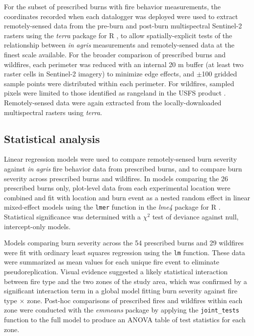 \documentclass[fire,article,submit,oneauthor,pdftex]{Definitions/mdpi}
\begin{document}
For the subset of prescribed burns with fire behavior measurements, the coordinates recorded when each datalogger was deployed were used to extract remotely-sensed data from the pre-burn and post-burn multispectral Sentinel-2 rasters using the \emph{terra} package for \textsf{R} \cite{hijmans2022}, to allow spatially-explicit tests of the relationship between \emph{in agris} measurements and remotely-sensed data at the finest scale available. 
For the broader comparison of prescribed burns and wildfires, each perimeter was reduced with an internal 20 m buffer (at least two raster cells in Sentinel-2 imagery) to minimize edge effects, and $\pm$100 gridded sample points were distributed within each perimeter. 
For wildfires, sampled pixels were limited to those identified as rangeland in the USFS product \cite{usdaforestservicenodate}. 
Remotely-sensed data were again extracted from the locally-downloaded multispectral rasters using \emph{terra}.

\subsection{Statistical analysis} 

Linear regression models were used to compare remotely-sensed burn severity against \emph{in agris} fire behavior data from prescribed burns, and to compare burn severity across prescribed burns and wildfires. 
In models comparing the 26 prescribed burns only, plot-level data from each experimental location were combined and fit with location and burn event as a nested random effect in linear mixed-effect models using  the \texttt{lmer} function in the \emph{lme4} package for \textsf{R} \cite{bates2015}. 
Statistical significance was determined with a $\chi^{2}$ test of deviance against null, intercept-only models. 

Models comparing burn severity across the 54 prescribed burns and 29 wildfires were fit with ordinary least squares regression using the \texttt{lm} function. 
These data were summarized as mean values for each unique fire event to eliminate pseudoreplication. 
Visual evidence suggested a likely statistical interaction between fire type and the two zones of the study area, which was confirmed by a significant interaction term in a global model fitting burn severity against fire type $\times$ zone.
Post-hoc comparisons of prescribed fires and wildfires within each zone were conducted with the \emph{emmeans} package \cite{lenth2018} by applying the \texttt{joint\_tests} function to the full model to produce an ANOVA table of test statistics for each zone. 
\end{document}
